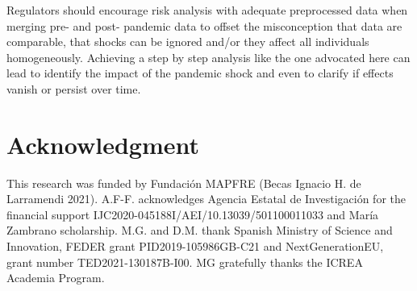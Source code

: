 \documentclass[]{risa}
\begin{document}
Regulators should encourage risk analysis with adequate preprocessed data when merging pre- and post- pandemic data to offset the misconception that data are comparable, that shocks can be ignored and/or they affect all individuals homogeneously. Achieving a step by step analysis like the one advocated here can lead to identify the impact of the pandemic shock and even to clarify if effects vanish or persist over time.

\backmatter

\section*{Acknowledgment}
This research was funded by Fundación MAPFRE (Becas Ignacio H. de Larramendi 2021). A.F-F. acknowledges Agencia Estatal de Investigaci\'on for the financial support IJC2020-045188I/AEI/10.13039/501100011033 and Mar\'ia Zambrano scholarship. M.G. and D.M. thank Spanish Ministry of Science and Innovation, FEDER grant PID2019-105986GB-C21 and NextGenerationEU, grant number TED2021-130187B-I00. MG gratefully thanks the ICREA Academia Program.



\end{document}

